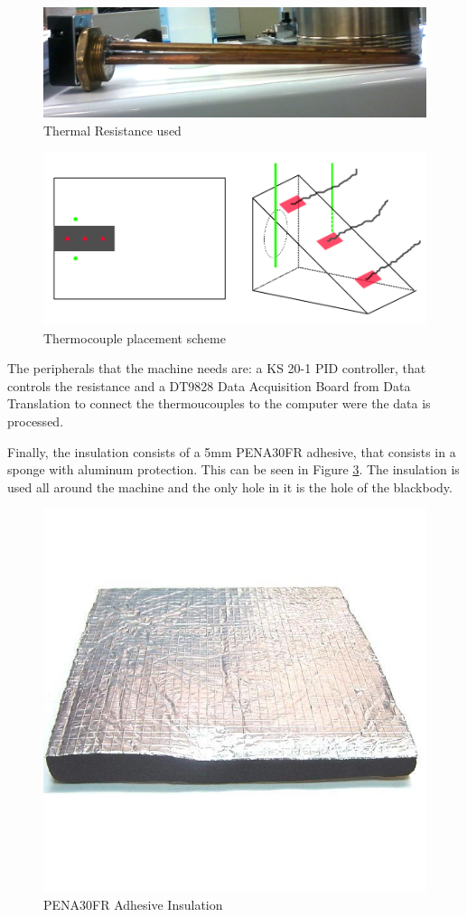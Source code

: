\begin{figure}[h]
\centering
\includegraphics[width=0.9\linewidth]{Figures/4.Chapter/resistencia.png}
\caption{Thermal Resistance used}
\label{fig:res}
\end{figure}

\begin{figure}[h]
\centering
\includegraphics[width=0.9\linewidth]{Figures/4.Chapter/termopares.png}
\caption{Thermocouple placement scheme}
\label{fig:tpar}
\end{figure}

\par The peripherals that the machine needs are: a KS 20-1 PID controller,  that controls the resistance and a DT9828 Data Acquisition Board from Data Translation to connect the thermoucouples to the computer were the data is processed.\\

\par Finally, the insulation consists of a 5mm PENA30FR adhesive, that consists in a sponge with aluminum protection. This can be seen in Figure \ref{fig:isola}. The insulation is used all around the machine and the only hole in it is the hole of the blackbody. \\

\begin{figure}[h]
\centering
\includegraphics[width=0.5\linewidth]{Figures/4.Chapter/insulation.jpg}
\caption{PENA30FR Adhesive Insulation}
\label{fig:isola}
\end{figure}

